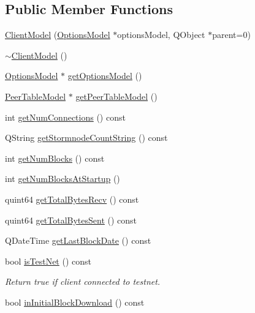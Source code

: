 \subsection*{Public Member Functions}
\begin{DoxyCompactItemize}
\item 
\hyperlink{class_client_model_aec1d32d5dc8c094eba66036a19a22854}{Client\+Model} (\hyperlink{class_options_model}{Options\+Model} $\ast$options\+Model, Q\+Object $\ast$parent=0)
\item 
\hyperlink{class_client_model_ab20086c4e6220c59b8464ee0e3fbb9da}{$\sim$\+Client\+Model} ()
\item 
\hyperlink{class_options_model}{Options\+Model} $\ast$ \hyperlink{class_client_model_ae8da1e2eabfbbcc49a7eed821908bdb6}{get\+Options\+Model} ()
\item 
\hyperlink{class_peer_table_model}{Peer\+Table\+Model} $\ast$ \hyperlink{class_client_model_a643fc112ce94f50ac7187ecdf3c75360}{get\+Peer\+Table\+Model} ()
\item 
int \hyperlink{class_client_model_a46a5b1e03c1dfdf151e440abc47946c7}{get\+Num\+Connections} () const 
\item 
Q\+String \hyperlink{class_client_model_a7d932efdb3a5722ff32f99abb3ab0325}{get\+Stormnode\+Count\+String} () const 
\item 
int \hyperlink{class_client_model_a9c298b0c2eb9c8e9ff18c6ff37725b0a}{get\+Num\+Blocks} () const 
\item 
int \hyperlink{class_client_model_a6bc7b2b076e7d4f999f189b6db74d909}{get\+Num\+Blocks\+At\+Startup} ()
\item 
quint64 \hyperlink{class_client_model_a175c96ffc4d793777316e36c501a7f94}{get\+Total\+Bytes\+Recv} () const 
\item 
quint64 \hyperlink{class_client_model_a4229224bf8a2df52e44438a449da6ba3}{get\+Total\+Bytes\+Sent} () const 
\item 
Q\+Date\+Time \hyperlink{class_client_model_a3dd65362947749364c48ff53a37820db}{get\+Last\+Block\+Date} () const 
\item 
bool \hyperlink{class_client_model_a019ce3b2d978d5bef4299eb381a3838f}{is\+Test\+Net} () const 
\begin{DoxyCompactList}\small\item\em Return true if client connected to testnet. \end{DoxyCompactList}\item 
bool \hyperlink{class_client_model_afc3389cd7eef94a0f20b6913beb05f40}{in\+Initial\+Block\+Download} () const 

\end{DoxyCompactItemize}
